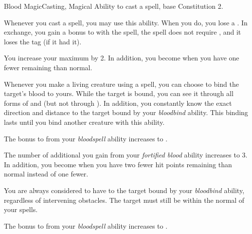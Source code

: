     \begin{feat}{Blood Magic}{Casting, Magical}
        \featpre Ability to cast a spell, base Constitution 2.

         Whenever you cast a spell, you may use this ability.
        When you do, you lose a .
        In exchange, you gain a  bonus to  with the spell, the spell does not require , and it loses the  tag (if it had it).

         You increase your maximum  by 2.
        In addition, you become  when you have one fewer  remaining than normal.

         Whenever you make a living creature  using a spell, you can choose to bind the target's blood to yours.
        While the target is bound, you can see it through all forms of  and  (but not through ).
        In addition, you constantly know the exact direction and distance to the target bound by your \textit{bloodbind} ability.
        This binding lasts until you bind another creature with this ability.

         The bonus to  from your \textit{bloodspell} ability increases to .

         The number of additional  you gain from your \textit{fortified blood} ability increases to 3.
        In addition, you become  when you have two fewer hit points remaining than normal instead of one fewer.

         You are always considered to have  to the target bound by your \textit{bloodbind} ability, regardless of intervening obstacles.
        The target must still be within the normal  of your spells.

         The bonus to  from your \textit{bloodspell} ability increases to .
    \end{feat}


